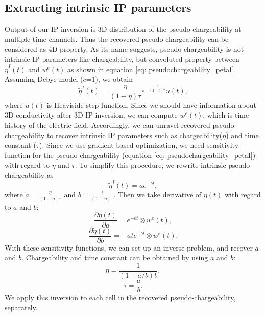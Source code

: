 \documentclass[a4paper, 11pt]{article}
\newcommand{\peta}{\tilde{\eta}}
\begin{document}
\subsection{Extracting intrinsic IP parameters}
\label{section: extract_intrinsicIP}
Output of our IP inversion is 3D distribution of the pseudo-chargeability at multiple time channels. 
Thus the recovered pseudo-chargeability can be considered as 4D property. 
As its name suggests, pseudo-chargeability is not intrinsic IP parameters like chargeability, but convoluted property between $\peta^{I}(t)$ and $w^{e}(t)$ as shown in equation \ref{eq: pseudochargeability_petaI}. 
Assuming Debye model ($c$=1), we obtain
\begin{equation}
    \peta^{I}(t) = \frac{\eta}{(1-\eta)\tau}e^{-\frac{t}{(1-\eta)\tau}}u(t),
    \label{eq: intrinsic_peta_debye}
\end{equation}
where $u(t)$ is Heaviside step function. 
Since we should have information about 3D conductivity after 3D IP inversion, we can compute  $w^e(t)$, which is time history of the electric field. 
Accordingly, we can unravel recovered pseudo-chargeability to recover intrinsic IP parameters such as chargeability($\eta$) and time constant ($\tau$). 
Since we use gradient-based optimization, we need sensitivity function for the pseudo-chargeability (equation \ref{eq: pseudochargeability_petaI}) with regard to $\eta$ and $\tau$. 
To simplify this procedure, we rewrite intrinsic pseudo-chargeability as 
\begin{equation}
  \peta^{I}(t) = a e^{-bt},
\end{equation}
where $a = \frac{\eta}{(1-\eta)\tau}$ and $b = \frac{t}{(1-\eta)\tau}$. 
Then we take derivative of $\peta(t)$ with regard to $a$ and $b$:
\begin{equation}
  \frac{\partial \peta(t)}{\partial a} = e^{-bt} \otimes w^e(t),
\end{equation}
\begin{equation}
  \frac{\partial \peta(t)}{\partial b} = -ate^{-bt} \otimes w^e(t).
\end{equation}
With these sensitivity functions, we can set up an inverse problem, and recover $a$ and $b$. 
Chargeability and time constant can be obtained by using $a$ and $b$:
\begin{equation}
  \eta =  \frac{1}{(1-a/b)b},
\end{equation}
\begin{equation}
  \tau =  \frac{a}{b}.
\end{equation}
We apply this inversion to each cell in the recovered pseudo-chargeability, separately. 
\end{document}
